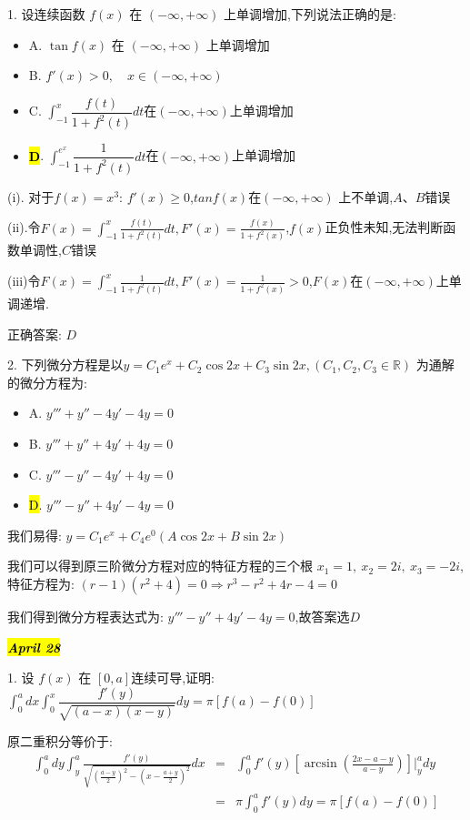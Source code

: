 1. 设连续函数 $f(x)$ 在 $(-\infty,+\infty)$ 上单调增加,下列说法正确的是: 
\begin{itemize}
	\item A. $\tan f(x)$ 在 $(-\infty,+\infty)$ 上单调增加
	\item B. $f'(x)>0,\quad x\in(-\infty,+\infty)$
	\item C. $\int_{-1}^{x}\dfrac{f(t)}{1+f^{2}(t)}dt$在$(-\infty,+\infty)$上单调增加
	\item \hl{\textbf{D}}. $\int_{-1}^{e^x}\dfrac{1}{1+f^{2}(t)}dt$在$(-\infty,+\infty)$上单调增加
\end{itemize}
\begin{solution}
	
(i). 对于$f(x)=x^3$: $f'(x)\geq 0$,$tan f(x)$在$(-\infty,+\infty)$ 上不单调,$A\text{、}B$错误
	
(ii).令$F(x)=\int_{-1}^{x}\frac{f(t)}{1+f^{2}(t)}dt,F'(x)=\frac{f(x)}{1+f^{2}(x)}$,$f(x)$正负性未知,无法判断函数单调性,$C$错误
	
(iii)令$F(x)=\int_{-1}^{x}\frac{1}{1+f^{2}(t)}dt,F'(x)=\frac{1}{1+f^{2}(x)}>0$,$F(x)$在$(-\infty,+\infty)$上单调递增.
	
正确答案: $D$
\end{solution}

2. 下列微分方程是以$y=C_{1}e^x+C_{2}\cos 2x+C_{3}\sin 2x,(C_{1},C_{2},C_{3}\in \mathbb{R})$ 为通解的微分方程为: 
\begin{itemize}
	\item A. $y'''+y''-4y'-4y=0$
	\item B. $y'''+y''+4y'+4y=0$
	\item C. $y'''-y''-4y'+4y=0$
	\item \hl{D}. $y'''-y''+4y'-4y=0$
\end{itemize}
\begin{solution}
	
	我们易得: $y=C_{1}e^{x}+C_{4}e^{0}(A\cos 2x+B\sin 2x)$
	
	我们可以得到原三阶微分方程对应的特征方程的三个根 $x_{1}=1,\ x_{2}=2i,\ x_{3}=-2i$,特征方程为: $(r-1)(r^2+4)=0\Rightarrow r^3-r^2+4r-4=0$
	
	我们得到微分方程表达式为: $y'''-y''+4y'-4y=0$,故答案选$D$
\end{solution}

\hl{\textbf{\textit{April 28}}}

1. 设 $f(x)$ 在 $[0,a]$连续可导,证明: $\int_{0}^{a}dx\int_{0}^{x}\dfrac{f'(y)}{\sqrt{(a-x)(x-y)}}dy=\pi[f(a)-f(0)]$
\begin{solution}
	
	原二重积分等价于: 
	\begin{eqnarray*}
		\int_{0}^{a}dy\int_{y}^{a}\frac{f'(y)}{\sqrt{(\frac{a-y}{2})^2-(x-\frac{a+y}{2})^2}}dx&=&\int_{0}^{a}f'(y)[\arcsin (\frac{2x-a-y}{a-y})]|_{y}^{a}dy\\
		&=&\pi\int_{0}^{a}f'(y)dy=\pi[f(a)-f(0)]
	\end{eqnarray*}
	
\end{solution}

